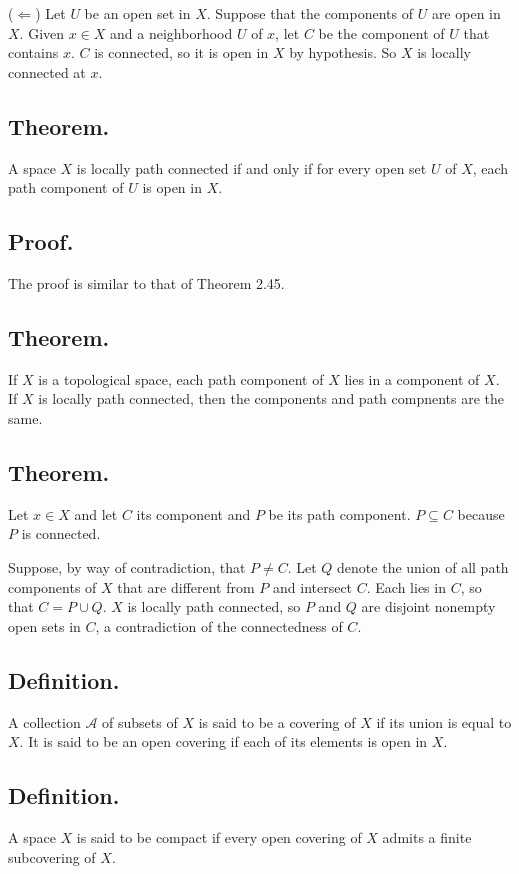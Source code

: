 \documentclass[titlepage]{article}
\begin{document}
($\Leftarrow$) Let $U$ be an open set in $X$. Suppose that the components of $U$ are open in $X$. Given $x \in X$ and a neighborhood $U$ of $x$, let $C$ be the component of $U$ that contains $x$. $C$ is connected, so it is open in $X$ by hypothesis. So $X$ is locally connected at $x$.

\subsection{Theorem.} A space $X$ is locally path connected if and only if for every open set $U$ of $X$, each path component of $U$ is open in $X$.

\subsection{Proof.} The proof is similar to that of Theorem 2.45.

\subsection{Theorem.} If $X$ is a topological space, each path component of $X$ lies in a component of $X$. If $X$ is locally path connected, then the components and path compnents are the same.

\subsection{Theorem.} Let $x \in X$ and let $C$ its component and $P$ be its path component. $P \subseteq C$ because $P$ is connected.

Suppose, by way of contradiction, that $P \neq C$. Let $Q$ denote the union of all path components of $X$ that are different from $P$ and intersect $C$. Each lies in $C$, so that $C = P \cup Q$. $X$ is locally path connected, so $P$ and $Q$ are disjoint nonempty open sets in $C$, a contradiction of the connectedness of $C$.

\subsection{Definition.} A collection $\mathcal{A}$ of subsets of $X$ is said to be a covering of $X$ if its union is equal to $X$. It is said to be an open covering if each of its elements is open in $X$.

\subsection{Definition.} A space $X$ is said to be compact if every open covering of $X$ admits a finite subcovering of $X$.
\end{document}
